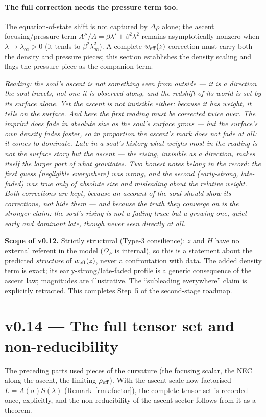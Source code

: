 \documentclass[11pt,a4paper]{article}
\newcommand{\note}[1]{\textcolor{black!65}{\emph{#1}}}
\theoremstyle{plain}
\theoremstyle{definition}
\theoremstyle{remark}
\begin{document}
\paragraph{The full correction needs the pressure term too.} The equation-of-state shift is not
captured by $\Delta\rho$ alone; the ascent focusing/pressure term
$A''/A=\beta\lambda'+\beta^2\lambda^2$ remains asymptotically nonzero when $\lambda\to\lambda_\infty>0$
(it tends to $\beta^2\lambda_\infty^2$). A complete $w_{\rm eff}(z)$ correction must carry both the
density and pressure pieces; this section establishes the density scaling and flags the pressure piece
as the companion term.

\note{Reading: the soul's ascent is not something seen from outside --- it is a direction the soul
travels, not one it is observed along, and the redshift of its world is set by its surface alone. Yet
the ascent is not invisible either: because it has weight, it tells on the surface. And here the first
reading must be corrected twice over. The imprint does fade in absolute size as the soul's surface
grows --- but the surface's own density fades faster, so in \emph{proportion} the ascent's mark does
not fade at all: it comes to dominate. Late in a soul's history what weighs most in the reading is not
the surface story but the ascent --- the rising, invisible as a direction, makes itself the larger part
of what gravitates. Two honest notes belong in the record: the first guess (negligible everywhere) was
wrong, and the second (early-strong, late-faded) was true only of absolute size and misleading about
the relative weight. Both corrections are kept, because an account of the soul should show its
corrections, not hide them --- and because the truth they converge on is the stronger claim: the soul's
rising is not a fading trace but a growing one, quiet early and dominant late, though never seen
directly at all.}

\textbf{Scope of v0.12.} Strictly structural (Type-3 consilience): $z$ and $H$ have no external
referent in the model ($\Omega_P$ is internal), so this is a statement about the predicted
\emph{structure} of $w_{\rm eff}(z)$, never a confrontation with data. The added density term is exact;
its early-strong/late-faded profile is a generic consequence of the ascent law; magnitudes are
illustrative. The ``subleading everywhere'' claim is explicitly retracted. This completes Step~5 of the
second-stage roadmap.

\FloatBarrier
\section*{v0.14 --- The full tensor set and non-reducibility}
The preceding parts used pieces of the curvature (the focusing scalar, the NEC along the ascent, the
limiting $\rho_{\rm eff}$). With the ascent scale now factorised $L=A(\sigma)S(\lambda)$
(Remark~\ref{rmk:factor}), the complete tensor set is recorded once, explicitly, and the
non-reducibility of the ascent sector follows from it as a theorem.
\end{document}
